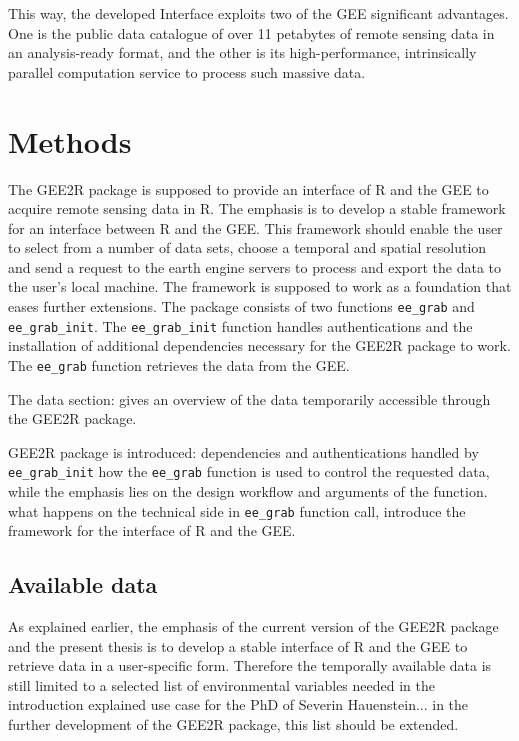\documentclass[12pt,twoside,a4paper,final]{report}
\begin{document}
This way, the developed Interface exploits two of the GEE significant advantages. One is the public data catalogue of over 11 petabytes of remote sensing data in an analysis-ready format, and the other is its high-performance, intrinsically parallel computation service to process such massive data.

\chapter{Methods}


The GEE2R package is supposed to provide an interface of R and the GEE to acquire remote sensing data in R. The emphasis is to develop a stable framework for an interface between R and the GEE. This framework should enable the user to select from a number of data sets, choose a temporal and spatial resolution and send a request to the earth engine servers to process and export the data to the user's local machine. The framework is supposed to work as a foundation that eases further extensions.
The package consists of two functions \texttt{ee\_grab} and \texttt{ee\_grab\_init}. The \texttt{ee\_grab\_init} function handles authentications and the installation of additional dependencies necessary for the GEE2R package to work. The \texttt{ee\_grab} function retrieves the data from the GEE.

The data section:
gives an overview of the data temporarily accessible through the GEE2R package. 

GEE2R package is introduced:
dependencies and authentications handled by \texttt{ee\_grab\_init}
how the \texttt{ee\_grab} function is used to control the requested data, while the emphasis lies on the design workflow and arguments of the function.
what happens on the technical side in \texttt{ee\_grab} function call, introduce the framework for the interface of R and the GEE.

\section{Available data}
As explained earlier, the emphasis of the current version of the GEE2R package and the present thesis is to develop a stable interface of R and the GEE to retrieve data in a user-specific form. Therefore the temporally available data is still limited to a selected list of environmental variables needed in the introduction explained use case for the PhD of Severin Hauenstein...
in the further development of the GEE2R package, this list should be extended.
\end{document}
